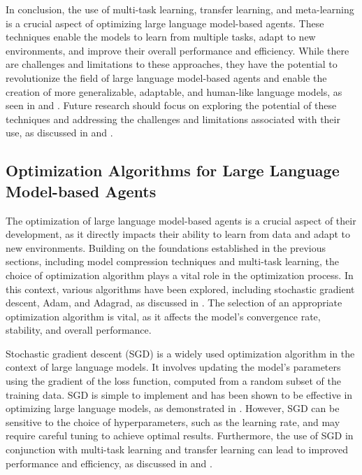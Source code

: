 \documentclass[11pt,a4paper]{article}
\begin{document}
In conclusion, the use of multi-task learning, transfer learning, and meta-learning is a crucial aspect of optimizing large language model-based agents. These techniques enable the models to learn from multiple tasks, adapt to new environments, and improve their overall performance and efficiency. While there are challenges and limitations to these approaches, they have the potential to revolutionize the field of large language model-based agents and enable the creation of more generalizable, adaptable, and human-like language models, as seen in \cite{arxiv:2402.12914} and \cite{arxiv:2407.07086}. Future research should focus on exploring the potential of these techniques and addressing the challenges and limitations associated with their use, as discussed in \cite{arxiv:2303.18223} and \cite{arxiv:2502.10708}.


\subsection{Optimization Algorithms for Large Language Model-based Agents}


The optimization of large language model-based agents is a crucial aspect of their development, as it directly impacts their ability to learn from data and adapt to new environments. Building on the foundations established in the previous sections, including model compression techniques and multi-task learning, the choice of optimization algorithm plays a vital role in the optimization process. In this context, various algorithms have been explored, including stochastic gradient descent, Adam, and Adagrad, as discussed in \cite{arxiv:2206.07682}. The selection of an appropriate optimization algorithm is vital, as it affects the model's convergence rate, stability, and overall performance.

Stochastic gradient descent (SGD) is a widely used optimization algorithm in the context of large language models. It involves updating the model's parameters using the gradient of the loss function, computed from a random subset of the training data. SGD is simple to implement and has been shown to be effective in optimizing large language models, as demonstrated in \cite{arxiv:2308.02151}. However, SGD can be sensitive to the choice of hyperparameters, such as the learning rate, and may require careful tuning to achieve optimal results. Furthermore, the use of SGD in conjunction with multi-task learning and transfer learning can lead to improved performance and efficiency, as discussed in \cite{doi:10.18653/v1/2023.acl-long.411} and \cite{arxiv:2308.03688}.
\end{document}
